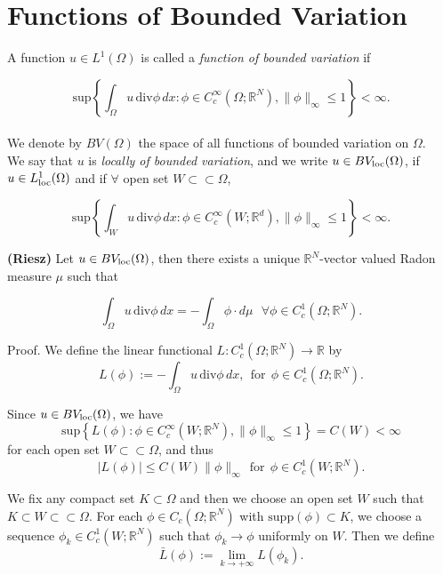 \section{Functions of Bounded Variation}

\begin{definition} A function $u \in L^{1}(\Omega)$ is called a {\em function of bounded variation} if

\[ \mathrm{sup}\left \{ \int_{\Omega} u\, \mathrm{div}\phi\, dx : \phi \in C_{c}^{\infty}(\Omega; \mathbb{R}^{N}), \|\phi\|_{\infty} \le 1 \right \} < \infty. \]
\\
We denote by $BV(\Omega)$ the space of all functions of bounded variation on $\Omega$.
\\
We say that $u$ is {\em locally of bounded variation}, and we write $u \in BV_{\rm loc}(\Omega)$, if $u \in L^{1}_{\rm loc}(\Omega)$ and if $\forall$ open set $W \subset \subset \Omega$,

\[ \mathrm{sup}\left \{ \int_{W} u\, \mathrm{div}\phi\, dx : \phi \in C_{c}^{\infty}(W; \mathbb{R}^{d}), \|\phi\|_{\infty} \le 1 \right \} < \infty. \] 
\end{definition}

\begin{theorem} \label{RieszBV} {\bf (Riesz)} Let $u \in BV_{\rm loc}(\Omega)$, then there exists a unique $\mathbb{R}^{N}$-vector valued Radon measure $\mu$ such that

\[ \int_{\Omega} u\, \mathrm{div}\phi\,dx = - \int_{\Omega} \phi \cdot d\mu   \   \  \ \forall \phi \in C_{c}^{1}(\Omega; \mathbb{R}^{N}). \]
\end{theorem}
Proof. We define the linear functional $L : C_{c}^{1}(\Omega; \mathbb{R}^{N}) \to \mathbb{R}$ by
\[ L(\phi) := -\int_{\Omega} u\, \mathrm{div}\phi \,dx, \ \ \text{for} \ \ \phi \in C_{c}^{1}(\Omega; \mathbb{R}^{N}). \]

Since $u \in BV_{\rm loc}(\Omega)$, we have
\[ \mathrm{sup}\left \{ L(\phi) : \phi \in C_{c}^{\infty}(W; \mathbb{R}^{N}), \|\phi\|_{\infty} \le 1 \right \} = C(W) < \infty\]
for each open set $W \subset \subset \Omega$, and thus
\[ |L(\phi)| \le C(W) \|\phi\|_{\infty} \  \ \text{for} \  \ \phi \in C^{1}_{c}(W ; \mathbb{R}^{N}). \]

We fix any compact set $K \subset \Omega$ and then we choose an open set $W$ such that $K \subset W \subset \subset \Omega$. For each $\phi \in C_{c}(\Omega ; \mathbb{R}^{N})$ with $\mathrm{supp}(\phi) \subset K$, we choose a sequence $\phi_{k} \in C^{1}_{c}(W ; \mathbb{R}^{N})$ such that $\phi_{k} \to \phi$ uniformly on $W$. Then we define
\[ \bar L(\phi) := \lim_{k \to +\infty} L(\phi_{k}). \]

